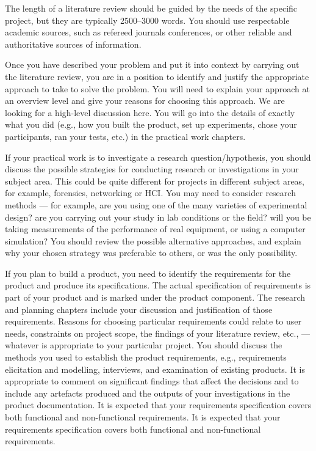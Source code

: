 {    The length of a literature review should be guided by the needs of the specific project, but they are typically 2500--3000 words. You should use respectable academic sources,
    such as refereed journals conferences, or other reliable and authoritative sources of information.

    Once you have described your problem and put it into context by carrying out the literature review, you are in a position to identify and justify the appropriate approach
    to take to solve the problem. You will need to explain your approach at an overview level and give your reasons for choosing this approach. We are looking for a
    high-level discussion here. You will go into the details of exactly what you did (e.g., how you built the product, set up experiments, chose your participants, ran your
    tests, etc.) in the practical work chapters.

    If your practical work is to investigate a research question/hypothesis, you should discuss the possible strategies for conducting research or
    investigations in your subject area. This could be quite different for projects in different subject areas, for example, forensics, networking or HCI. You may need to
    consider research methods --- for example, are you using one of the many varieties of experimental design? are you carrying out your study in lab conditions or the
    field? will you be taking measurements of the performance of real equipment, or using a computer simulation? You should review the possible alternative approaches, and
    explain why your chosen strategy was preferable to others, or was the only possibility.

    If you plan to build a product, you need to identify the requirements for the product and produce its specifications. The actual specification of requirements is part
    of your product and is marked under the product component. The research and planning chapters include your discussion and justification of those requirements. Reasons
    for choosing particular requirements could relate to user needs, constraints on project scope, the findings of your literature review, etc., --- whatever is appropriate
    to your particular project. You should discuss the methods you used to establish the product requirements, e.g., requirements elicitation and modelling, interviews,
    and examination of existing products. It is appropriate to comment on significant findings that affect the decisions and to include any artefacts produced and the outputs
    of your investigations in the product documentation. It is expected that your requirements specification covers both functional and non-functional requirements. It is
    expected that your requirements specification covers both functional and non-functional requirements.

}
